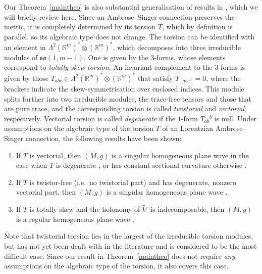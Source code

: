 \documentclass[11pt,a4paper]{amsart}
\newcommand{\tnab}{\widetilde{\nabla}}
\newcommand{\+}{\oplus}
\newcommand{\so}{\mathfrak{so}}
\newcommand{\1}{\mathbf{1}}
\newcommand{\R}{\mathbb{R}} %
\newcommand{\<}{\langle}
\renewcommand{\>}{\rangle}
\theoremstyle{definition}
\theoremstyle{plain}
\numberwithin{equation}{section}
\begin{document}
Our  Theorem~\ref{maintheo} is also substantial generalisation of results in 
 \cite{Meessen06,Montesinos-Amil01, ErnstGalaev22, ErnstGalaev23}, which we will briefly review  here. Since an Ambrose--Singer connection preserves the metric, it is completely determined by its torsion $T$, which by definition is parallel, so its algebraic type does not change. The torsion 
 can be identified with an element in $\Lambda^2(\R^m)^* \otimes (\R^m)^*$, which decomposes into three irreducible modules of $\so(1,m-1)$. One is given by the $3$-forms, whose elements correspond to  {\em totally skew torsion}. An invariant complement to the $3$-forms is given by those $T_{abc}\in \Lambda^2(\R^m)^* \otimes (\R^m)^*$ that satisfy $T_{[abc]}=0$, where the brackets indicate the skew-symmetrisation over enclosed indices. This module splits further into two irreducible modules, the trace-free tensors and those that are pure trace, and the corresponding torsion is called {\em twistorial} and {\em vectorial}, respectively.  Vectorial torsion is called {\em degenerate} if the $1$-form $T_{ab}{}^b$ is null.
Under  assumptions on the algebraic type of the torsion $T$ of an Lorentzian Ambrose--Singer connection, the following results have been shown:
\begin{enumerate}
\item If $T$ is  vectorial, then $(M,g)$ is a singular homogeneous plane wave in the case when  $T$ is degenerate \cite{Montesinos-Amil01},
or  has constant sectional curvature otherwise
 \cite{GadeaOubina97}.
\item If $T$ is twistor-free (i.e.~no twistorial part) and has  degenerate, nonzero vectorial part, then $(M,g)$ is a singular homogeneous plane wave  \cite{Meessen06}.
\item If $T$ is totally skew and the holonomy of  $\tnab$ is indecomposable, then $(M,g)$ is a regular homogeneous plane wave  \cite{ErnstGalaev22}.
\end{enumerate}
Note that  twistorial torsion lies in the   largest of the irreducible torsion modules, but has not yet been dealt with in the literature and is considered to be the most difficult case. Since our result in Theorem~\ref{maintheo} does not require {\em any} assumptions on the algebraic type of the torsion, it  also covers this case.
 
\end{document}
